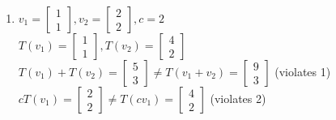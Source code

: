 \documentclass[12pt]{amsart}
\begin{document}
\begin{enumerate}
{\begin{enumerate}
    \item $v_1=\left[\begin{matrix} 1 \\ 1\end{matrix}\right],v_2=\left[\begin{matrix} 2 \\ 2\end{matrix}\right],c=2$\\
          $T(v_1)=\left[\begin{matrix} 1 \\ 1 \end{matrix}\right],T(v_2)=\left[\begin{matrix} 4 \\ 2\end{matrix}\right]$\\
          $T(v_1)+T(v_2)=\left[\begin{matrix} 5 \\ 3\end{matrix}\right]\ne T(v_1+v_2)=\left[\begin{matrix} 9 \\ 3\end{matrix}\right]$ (violates 1)\\
          $cT(v_1)=\left[\begin{matrix} 2 \\ 2\end{matrix}\right]\ne T(cv_1)=\left[\begin{matrix} 4 \\ 2\end{matrix}\right]$ (violates 2)


\end{enumerate}}
\end{enumerate}
\end{document}
